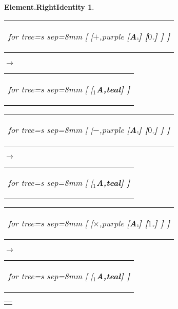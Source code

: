 \documentclass[UTF8,10pt]{ctexart}
\newcommand{\Bigskip}{\bigskip\medskip}
\newcommand{\subtreeA}{\bf A}
\newcommand{\I}{$_{\scriptscriptstyle 1}$}
\newcommand{\lc}{$_{\:\!\scriptscriptstyle\rm l\!}$}
\newcommand{\rc}{$_{\:\!\scriptscriptstyle\rm r\!}$}
\newcommand{\Zero}{$0$}
\newcommand{\One}{$1$}
\newcommand{\Addition}{$+$}
\newcommand{\Subtraction}{$-$}
\newcommand{\Multiplication}{$\times$}
\newtheorem*{Element.RightIdentity}{\bf Element.RightIdentity }
\begin{document}
	\begin{center}\vspace*{\fill}
		\begin{Element.RightIdentity}
			\qquad\par\Bigskip
			\begin{tabular}{c}
				\begin{forest}
					for tree={s sep=8mm}
					[
						[\Addition,purple
							[\subtreeA\lc]
							[\Zero\rc]
						]
					]
				\end{forest}
			\end{tabular}
			\qquad
			$\longrightarrow$
			\qquad
			\begin{tabular}{c}
				\begin{forest}
					for tree={s sep=8mm}
					[
						[\I\subtreeA,teal]
					]
				\end{forest}
			\end{tabular}
			\par\bigskip
			\begin{tabular}{c}
				\begin{forest}
					for tree={s sep=8mm}
					[
						[\Subtraction,purple
							[\subtreeA\lc]
							[\Zero\rc]
						]
					]
				\end{forest}
			\end{tabular}
			\qquad
			$\longrightarrow$
			\qquad
			\begin{tabular}{c}
				\begin{forest}
					for tree={s sep=8mm}
					[
						[\I\subtreeA,teal]
					]
				\end{forest}
			\end{tabular}
			\par\bigskip
			\begin{tabular}{c}
				\begin{forest}
					for tree={s sep=8mm}
					[
						[\Multiplication,purple
							[\subtreeA\lc]
							[\One\rc]
						]
					]
				\end{forest}
			\end{tabular}
			\qquad
			$\longrightarrow$
			\qquad
			\begin{tabular}{c}
				\begin{forest}
					for tree={s sep=8mm}
					[
						[\I\subtreeA,teal]
					]
				\end{forest}
			\end{tabular}
			\par\bigskip
			\begin{tabular}{c}
				\begin{forest}

\end{forest}
\end{tabular}
\end{Element.RightIdentity}
\end{center}
\end{document}

